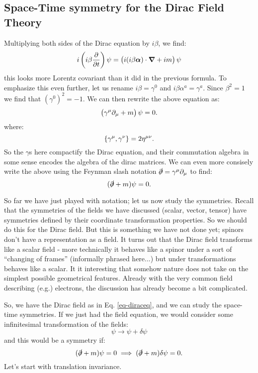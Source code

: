 \subsection{Space-Time symmetry for the Dirac Field Theory}
Multiplying both sides of the Dirac equation by $i\beta$, we find:
\begin{equation}
    i\left(i\beta\dpd{}{t}\right)\psi = \left(i(i\beta \gv{\alpha})\cdot \nabla + im\right)\psi
\end{equation}
this looks more Lorentz covariant than it did in the previous formula. To emphasize this even further, let us rename $i\beta = \gamma^0$ and $i\beta \alpha^a = \gamma^a$. Since $\beta^2 = 1$ we find that $(\gamma^0)^2 = -1$. We can then rewrite the above equation as:
\begin{equation}\label{eq-diraceq}
    \left(\gamma^\mu \partial_\mu + m\right)\psi = 0.
\end{equation}
where:
\begin{equation}
    \set{\gamma^\mu, \gamma^\nu} = 2\eta^{\mu\nu}.
\end{equation}
So the $\gamma$s here compactify the Dirac equation, and their commutation algebra in some sense encodes the algebra of the dirac matrices. We can even more consisely write the above using the Feynman slash notation $\slashed{\partial} = \gamma^\mu \partial_\mu$ to find:
\begin{equation}
    (\slashed{\partial} + m)\psi = 0.
\end{equation}

So far we have just played with notation; let us now study the symmetries. Recall that the symmetries of the fields we have discussed (scalar, vector, tensor) have symmetries defined by their coordinate transformation properties. So we should do this for the Dirac field. But this is something we have not done yet; spinors don't have a representation as a field. It turns out that the Dirac field transforms like a scalar field - more technically it behaves like a spinor under a sort of ``changing of frames'' (informally phrased here...) but under transformations behaves like a scalar. It it interesting that somehow nature does not take on the simplest possible geometrical features. Already with the very common field describing (e.g.) electrons, the discussion has already become a bit complicated.

So, we have the Dirac field as in Eq. \eqref{eq-diraceq}, and we can study the space-time symmetries. If we just had the field equation, we would consider some infinitesimal transformation of the fields:
\begin{equation}
    \psi \to \psi + \delta \psi
\end{equation}
and this would be a symmetry if:
\begin{equation}
    (\slashed{\partial} + m)\psi = 0 \implies (\slashed{\partial} + m)\delta \psi = 0.
\end{equation}
Let's start with translation invariance.

